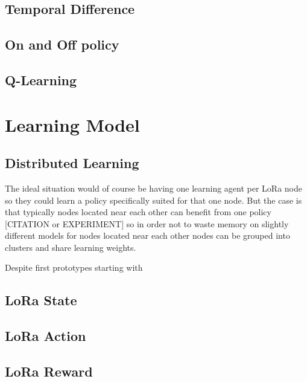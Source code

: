 \section{Temporal Difference}
\section{On and Off policy}
\section{Q-Learning}
\chapter{Learning Model}
\section{Distributed Learning}

The ideal situation would of course be having one learning agent 
per LoRa node so they could learn a policy specifically suited for
that one node. But the case is that typically nodes located 
near each other can benefit from one policy [CITATION or EXPERIMENT]
so in order not to waste memory on slightly different models 
for nodes located near each other nodes can be grouped into clusters
and share learning weights.



Despite first prototypes starting with 

\section{LoRa State}
\section{LoRa Action}
\section{LoRa Reward}

